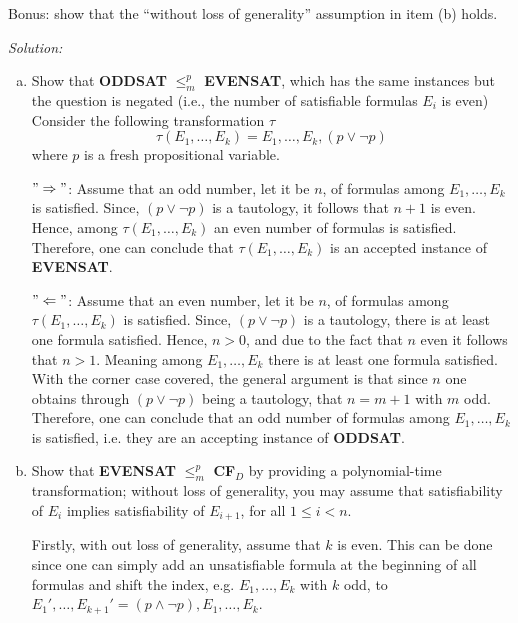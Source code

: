 \documentclass[11pt,a4paper]{article}
\begin{document}
\begin{enumerate}
Bonus: show that the ``without loss of generality'' assumption in
item (b) holds.

\bigskip

\emph{Solution:}\\

\begin{enumerate}[(a)]
\item Show that  {\bf ODDSAT} $\leq^p_m$ {\bf EVENSAT}, which has
the same instances but the question is negated (i.e., the number of
satisfiable formulas $E_i$ is even) \\



Consider the following transformation $\tau$ 
\begin{equation*}
\tau(E_1, \dots, E_k) = E_1, \dots, E_k, (p \lor \neg p)
\end{equation*}
where $p$ is a fresh propositional variable.

$"\Rightarrow"$: Assume that an odd number, let it be $n$, of formulas among $E_1, \dots, E_k$ is satisfied. Since, $(p \lor \neg p)$ is a tautology, it follows that $n+1$ is even. Hence, among $\tau(E_1, \dots, E_k)$ an even number of formulas is satisfied. Therefore, one can conclude that $\tau(E_1, \dots, E_k)$ is an accepted instance of \textbf{EVENSAT}.

$"\Leftarrow"$: Assume that an even number, let it be $n$, of formulas among $\tau(E_1, \dots, E_k)$ is satisfied. Since, $(p \lor \neg p)$ is a tautology, there is at least one formula satisfied. Hence, $n>0$, and due to the fact that $n$ even it follows that $n>1$. Meaning among $E_1, \dots, E_k$ there is at least one formula satisfied. With the corner case covered, the general argument is that since $n$ one obtains through $(p \lor \neg p)$ being a tautology, that $n=m+1$ with $m$ odd. Therefore, one can conclude that an odd number of formulas among $E_1, \dots, E_k$ is satisfied, i.e. they are an accepting instance of \textbf{ODDSAT}. \\



\item Show that {\bf EVENSAT} $\leq^p_m$ {\bf CF}$_D$ by providing a
polynomial-time transformation; without
loss of generality, you may assume that satisfiability of $E_i$ implies satisfiability of $E_{i+1}$, for 
all $1\leq i < n$.



Firstly, with out loss of generality, assume that $k$ is even. This can be done since one can simply add an unsatisfiable formula at the beginning of all formulas and shift the index, e.g. $E_1, \dots, E_k$ with $k$ odd, to $ E_1', \dots, E_{k+1}'= (p \land \neg p),  E_1, \dots, E_k$.


\end{enumerate}
\end{enumerate}
\end{document}
